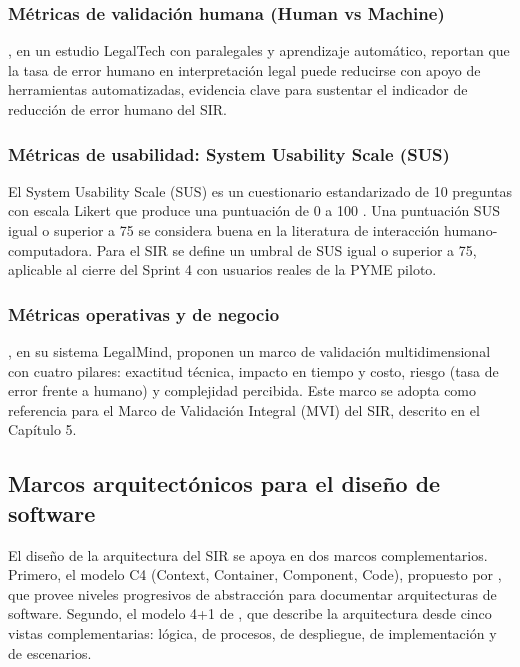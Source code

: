 \documentclass[12pt,a4paper,oneside]{report}
\begin{document}
\subsubsection{Métricas de validación humana (Human vs Machine)}\label{subsubsec:metricas-validacion-humana}

\textcite{orosz2021}, en un estudio LegalTech con paralegales y aprendizaje automático, reportan que la tasa de error humano en interpretación legal puede reducirse con apoyo de herramientas automatizadas, evidencia clave para sustentar el indicador de reducción de error humano del SIR.

\subsubsection{Métricas de usabilidad: System Usability Scale (SUS)}\label{subsubsec:metricas-usabilidad-sus}

El System Usability Scale (SUS) es un cuestionario estandarizado de 10 preguntas con escala Likert que produce una puntuación de 0 a 100 \parencite{brooke1996}. Una puntuación SUS igual o superior a 75 se considera buena en la literatura de interacción humano-computadora. Para el SIR se define un umbral de SUS igual o superior a 75, aplicable al cierre del Sprint 4 con usuarios reales de la PYME piloto.

\subsubsection{Métricas operativas y de negocio}\label{subsubsec:metricas-operativas-negocio}

\textcite{raju2025}, en su sistema LegalMind, proponen un marco de validación multidimensional con cuatro pilares: exactitud técnica, impacto en tiempo y costo, riesgo (tasa de error frente a humano) y complejidad percibida. Este marco se adopta como referencia para el Marco de Validación Integral (MVI) del SIR, descrito en el Capítulo 5.

\subsection{Marcos arquitectónicos para el diseño de software}\label{subsec:marcos-arquitectonicos-diseno-software}

El diseño de la arquitectura del SIR se apoya en dos marcos complementarios. Primero, el modelo C4 (Context, Container, Component, Code), propuesto por \textcite{brown2018}, que provee niveles progresivos de abstracción para documentar arquitecturas de software. Segundo, el modelo 4+1 de \textcite{kruchten1995}, que describe la arquitectura desde cinco vistas complementarias: lógica, de procesos, de despliegue, de implementación y de escenarios.
\end{document}
